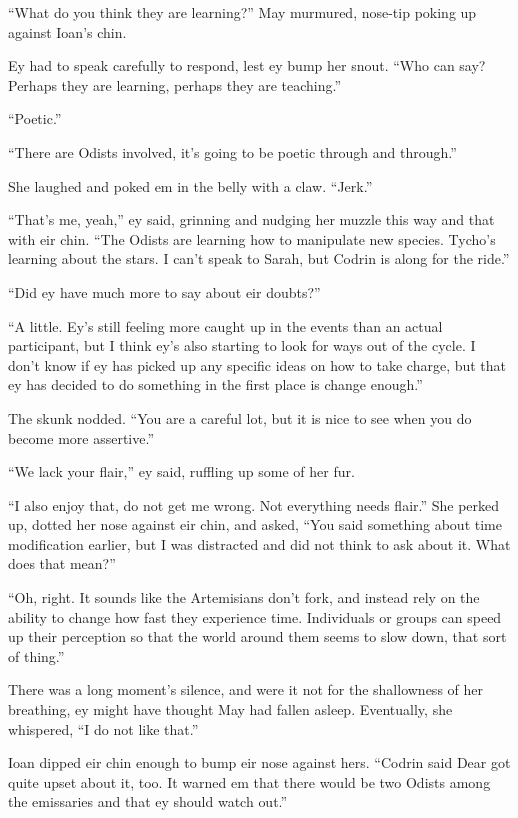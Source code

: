 ``What do you think they are learning?'' May murmured, nose-tip poking up against Ioan's chin.

Ey had to speak carefully to respond, lest ey bump her snout. ``Who can say? Perhaps they are learning, perhaps they are teaching.''

``Poetic.''

``There are Odists involved, it's going to be poetic through and through.''

She laughed and poked em in the belly with a claw. ``Jerk.''

``That's me, yeah,'' ey said, grinning and nudging her muzzle this way and that with eir chin. ``The Odists are learning how to manipulate new species. Tycho's learning about the stars. I can't speak to Sarah, but Codrin is along for the ride.''

``Did ey have much more to say about eir doubts?''

``A little. Ey's still feeling more caught up in the events than an actual participant, but I think ey's also starting to look for ways out of the cycle. I don't know if ey has picked up any specific ideas on how to take charge, but that ey has decided to do something in the first place is change enough.''

The skunk nodded. ``You are a careful lot, but it is nice to see when you do become more assertive.''

``We lack your flair,'' ey said, ruffling up some of her fur.

``I also enjoy that, do not get me wrong. Not everything needs flair.'' She perked up, dotted her nose against eir chin, and asked, ``You said something about time modification earlier, but I was distracted and did not think to ask about it. What does that mean?''

``Oh, right. It sounds like the Artemisians don't fork, and instead rely on the ability to change how fast they experience time. Individuals or groups can speed up their perception so that the world around them seems to slow down, that sort of thing.''

There was a long moment's silence, and were it not for the shallowness of her breathing, ey might have thought May had fallen asleep. Eventually, she whispered, ``I do not like that.''

Ioan dipped eir chin enough to bump eir nose against hers. ``Codrin said Dear got quite upset about it, too. It warned em that there would be two Odists among the emissaries and that ey should watch out.''

